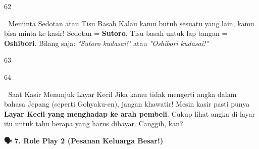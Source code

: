 \begin{convobox}{62}
    \noindent

    \vspace{1.5em}
\end{convobox}

\begin{lessonbox}{🍭 Meminta Sedotan atau Tisu Basah}
    Kalau kamu butuh sesuatu yang lain, kamu bisa minta ke kasir!
    Sedotan = \textbf{Sutoro}. Tisu basah untuk lap tangan = \textbf{Oshibori}. 
    Bilang saja: \textit{"Sutoro kudasai!"} atau \textit{"Oshibori kudasai!"}
\end{lessonbox}

\begin{convobox}{63}
    \noindent
     

    \vspace{1.5em}
\end{convobox}

\begin{convobox}{64}
    \noindent
     

    \vspace{1.5em}
\end{convobox}

\begin{lessonbox}{📱 Saat Kasir Menunjuk Layar Kecil}
    Jika kamu tidak mengerti angka dalam bahasa Jepang (seperti Gohyaku-en), jangan khawatir! Mesin kasir pasti punya \textbf{Layar Kecil yang menghadap ke arah pembeli}. Cukup lihat angka di layar itu untuk tahu berapa yang harus dibayar. Canggih, kan?
\end{lessonbox}

\vspace{1em}
\begin{tcolorbox}[colback=boxframe, colframe=boxframe, rounded corners, boxrule=0pt, arc=3mm, left=2mm, top=2mm, bottom=2mm]
    \Large \bfseries \color{white} 🗣️ 7. Role Play 2 (Pesanan Keluarga Besar!)
\end{tcolorbox}
\vspace{1em}

